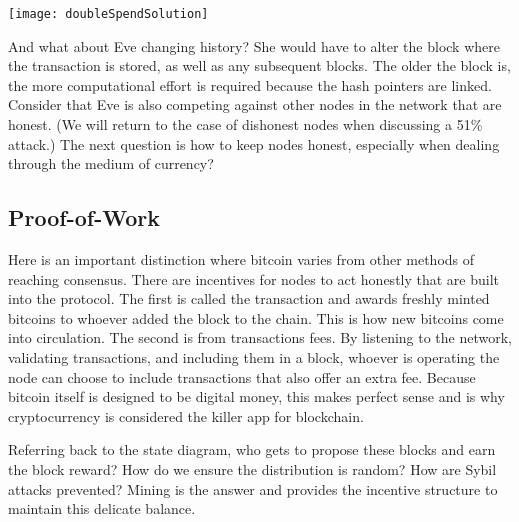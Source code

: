 \begin{center}
	\texttt{[image: doubleSpendSolution]}
\end{center}

And what about Eve changing history? She would have to alter the block where the transaction is stored, as well as any subsequent blocks. The older the block is, the more computational effort is required because the hash pointers are linked. Consider that Eve is also competing against other nodes in the network that are honest. (We will return to the case of dishonest nodes when discussing a 51\% attack.) The next question is how to keep nodes honest, especially when dealing through the medium of currency? 

\subsection*{Proof-of-Work}\label{Se:POW}
Here is an important distinction where bitcoin varies from other methods of reaching consensus. There are incentives for nodes to act honestly that are built into the protocol. The first is called the  transaction and awards freshly minted bitcoins to whoever added the block to the chain. This is how new bitcoins come into circulation. The second is from transactions fees. By listening to the network, validating transactions, and including them in a block, whoever is operating the node can choose to include transactions that also offer an extra fee. Because bitcoin itself is designed to be digital money, this makes perfect sense and is why cryptocurrency is considered the killer app for blockchain. 

Referring back to the state diagram, who gets to propose these blocks and earn the block reward? How do we ensure the distribution is random? How are Sybil attacks prevented? Mining is the answer and provides the incentive structure to maintain this delicate balance.

